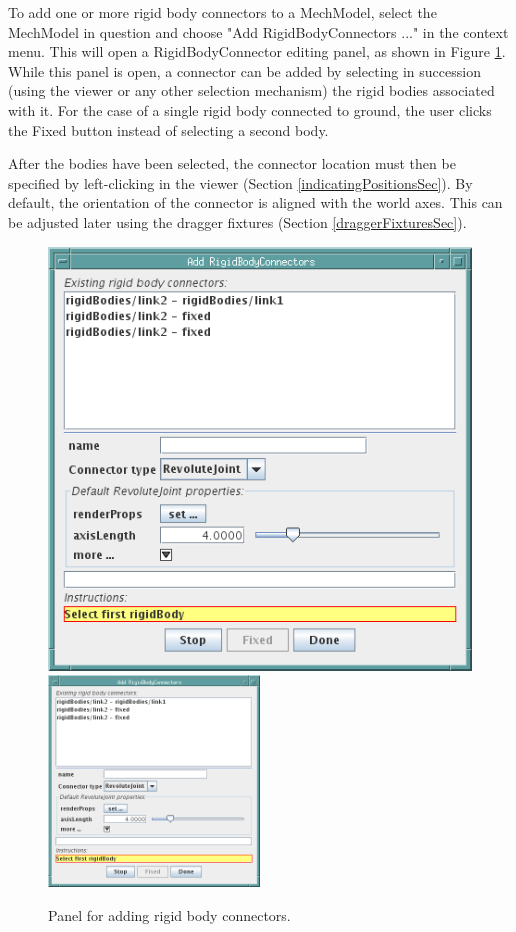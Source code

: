 \documentclass{article}
\begin{document}
To add one or more rigid body connectors to a MechModel, select the
MechModel in question and choose {\sf "Add RigidBodyConnectors ..."} in the
context menu. This will open a RigidBodyConnector editing panel, as
shown in Figure \ref{addRigidBodyConnectorsPanelFig}. While this panel is open, a
connector can be added by selecting in succession (using the viewer or
any other selection mechanism) the rigid bodies associated with
it. For the case of a single rigid body connected to ground, the user clicks 
the {\sf Fixed} button instead of selecting a second body. 

After the bodies have been selected, the connector location must then be
specified by left-clicking in the viewer (Section \ref{indicatingPositionsSec}).
By default, the orientation of the connector is aligned with the world
axes. This can be adjusted later using the dragger fixtures 
(Section \ref{draggerFixturesSec}).

\begin{figure}
\begin{center}
\iflatexml
\includegraphics[]{images/addRigidBodyConnectorsPanel}
\else
\includegraphics[width=0.50\textwidth]{images/addRigidBodyConnectorsPanel}
\fi
\end{center}
\caption{Panel for adding rigid body connectors.}%
\label{addRigidBodyConnectorsPanelFig}
\end{figure}
\end{document}
